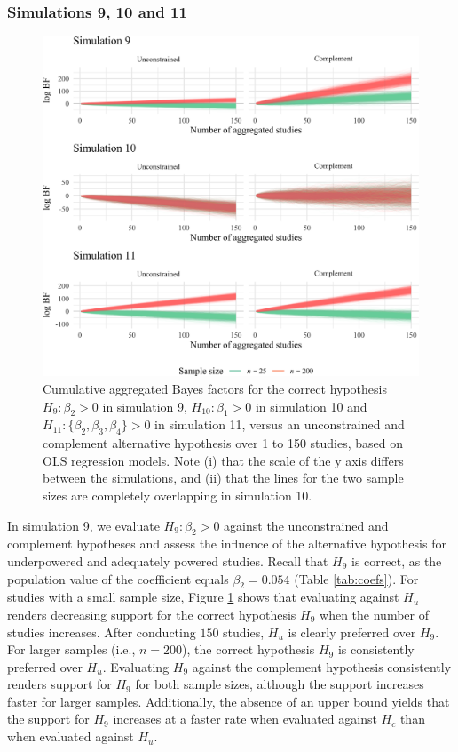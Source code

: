 \documentclass[review, 3p, authoryear]{elsarticle} %
\begin{document}
\hypertarget{simulations-9-10-and-11}{%
\subsubsection{Simulations 9, 10 and 11}\label{simulations-9-10-and-11}}

\begin{figure}[!t]
\includegraphics[width=1\linewidth]{manuscript_volker_files/figure-latex/BF91011-1} \caption{Cumulative aggregated Bayes factors for the correct hypothesis $H_9: \beta_2 > 0$ in simulation 9, $H_{10}: \beta_1 > 0$ in simulation 10 and $H_{11}: \{\beta_2, \beta_3, \beta_4\} > 0$ in simulation 11, versus an unconstrained and complement alternative hypothesis over 1 to 150 studies, based on OLS regression models. Note (i) that the scale of the y axis differs between the simulations, and (ii) that the lines for the two sample sizes are completely overlapping in simulation 10.}\label{fig:BF91011}
\end{figure}

In simulation 9, we evaluate \(H_9: \beta_2 > 0\) against the unconstrained and complement hypotheses and assess the influence of the alternative hypothesis for underpowered and adequately powered studies.
Recall that \(H_9\) is correct, as the population value of the coefficient equals \(\beta_2 = 0.054\) (Table \ref{tab:coefs}).
For studies with a small sample size, Figure \ref{fig:BF91011} shows that evaluating against \(H_u\) renders decreasing support for the correct hypothesis \(H_9\) when the number of studies increases.
After conducting \(150\) studies, \(H_u\) is clearly preferred over \(H_9\).
For larger samples (i.e., \(n = 200\)), the correct hypothesis \(H_9\) is consistently preferred over \(H_u\).
Evaluating \(H_9\) against the complement hypothesis consistently renders support for \(H_9\) for both sample sizes, although the support increases faster for larger samples.
Additionally, the absence of an upper bound yields that the support for \(H_9\) increases at a faster rate when evaluated against \(H_c\) than when evaluated against \(H_u\).
\end{document}

